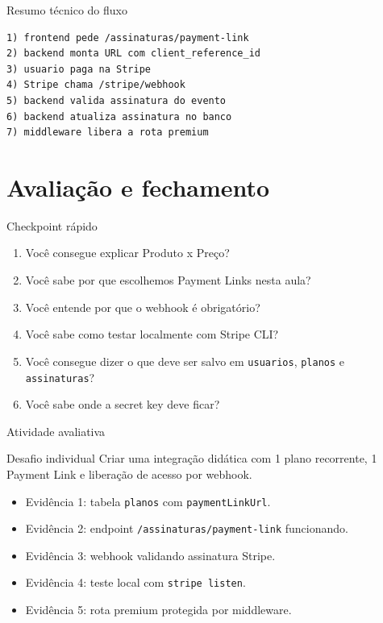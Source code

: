 \documentclass[aspectratio=169]{beamer}
\newcommand{\code}[1]{\texttt{#1}}
\begin{document}
\begin{frame}[fragile]{Resumo técnico do fluxo}
\begin{lstlisting}[language={}]
1) frontend pede /assinaturas/payment-link
2) backend monta URL com client_reference_id
3) usuario paga na Stripe
4) Stripe chama /stripe/webhook
5) backend valida assinatura do evento
6) backend atualiza assinatura no banco
7) middleware libera a rota premium
\end{lstlisting}
\end{frame}

\section{Avaliação e fechamento}

\begin{frame}{Checkpoint rápido}
\begin{enumerate}
  \item Você consegue explicar Produto x Preço?
  \item Você sabe por que escolhemos Payment Links nesta aula?
  \item Você entende por que o webhook é obrigatório?
  \item Você sabe como testar localmente com Stripe CLI?
  \item Você consegue dizer o que deve ser salvo em \code{usuarios}, \code{planos} e \code{assinaturas}?
  \item Você sabe onde a secret key deve ficar?
\end{enumerate}
\end{frame}

\begin{frame}{Atividade avaliativa}
\begin{block}{Desafio individual}
Criar uma integração didática com 1 plano recorrente, 1 Payment Link e liberação de acesso por webhook.
\end{block}

\begin{itemize}
  \item Evidência 1: tabela \code{planos} com \code{paymentLinkUrl}.
  \item Evidência 2: endpoint \code{/assinaturas/payment-link} funcionando.
  \item Evidência 3: webhook validando assinatura Stripe.
  \item Evidência 4: teste local com \code{stripe listen}.
  \item Evidência 5: rota premium protegida por middleware.
\end{itemize}
\end{frame}
\end{document}
